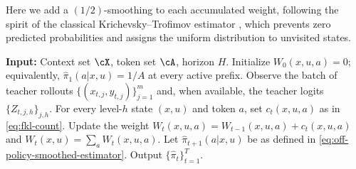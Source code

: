 \documentclass[11pt]{article}
\begin{document}
Here we add a $(1/2)$-smoothing to each accumulated weight, following the spirit of the classical Krichevsky--Trofimov estimator \citep{krichevsky1981performance}, which prevents zero predicted probabilities and assigns the uniform distribution to unvisited states.
\begin{algorithm}[H]
\caption{Per-Prefix Forward KL}
    \begin{algorithmic}[1]\label{algo:ar-fkl}
    \STATE \textbf{Input:} Context set $\cX$, token set $\cA$, horizon $H$.
    \STATE Initialize $W_0(x,u,a)=0$; equivalently, $\hat\pi_1(a|x,u)=1/A$ at every active prefix.
    \STATE Observe the batch of teacher rollouts $\{(x_{t,j},y_{t,j})\}_{j=1}^{m}$ and, when available, the teacher logits $\{Z_{t,j,h}\}_{j,h}$.
    \STATE For every level-$h$ state $(x,u)$ and token $a$, set $c_t(x,u,a)$ as in \eqref{eq:fkl-count}.
    \STATE Update the weight $W_t(x,u,a) = W_{t-1}(x,u,a)+c_t(x,u,a)$ and $W_t(x,u) = \sum_{a} W_t(x,u,a)$.
    \STATE Let $\hat\pi_{t+1}(a|x,u)$ be as defined in \eqref{eq:off-policy-smoothed-estimator}.
    \ENDFOR
    \STATE Output $\{\hat\pi_t\}_{t=1}^T$.
    \end{algorithmic}
\end{algorithm}
\end{document}

